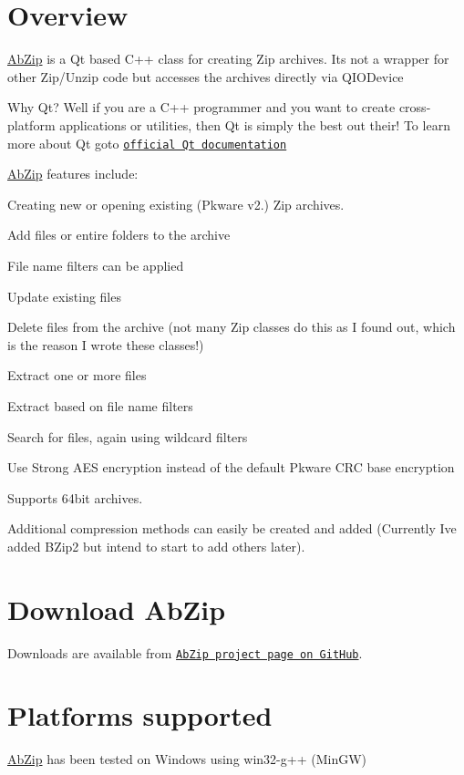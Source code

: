 \hypertarget{index_overview}{}\section{Overview}\label{index_overview}
\hyperlink{class_ab_zip}{Ab\+Zip} is a Qt based C++ class for creating Zip archives. It\textquotesingle{}s not a wrapper for other Zip/\+Unzip code but accesses the archives directly via Q\+I\+O\+Device

Why Qt? Well if you are a C++ programmer and you want to create cross-\/platform applications or utilities, then Qt is simply the best out their! To learn more about Qt goto \href{http://qt-project.org/doc/}{\tt official Qt documentation}

\hyperlink{class_ab_zip}{Ab\+Zip} features include\+:
\begin{DoxyItemize}
\item Creating new or opening existing (Pkware v2.) Zip archives.
\item Add files or entire folders to the archive
\item File name filters can be applied
\item Update existing files
\item Delete files from the archive (not many Zip classes do this as I found out, which is the reason I wrote these classes!)
\item Extract one or more files
\item Extract based on file name filters
\item Search for files, again using wildcard filters
\item Use Strong A\+ES encryption instead of the default Pkware C\+RC base encryption
\item Supports 64bit archives.
\item Additional compression methods can easily be created and added (Currently I\textquotesingle{}ve added B\+Zip2 but intend to start to add others later).
\end{DoxyItemize}\hypertarget{index_download}{}\section{Download Ab\+Zip}\label{index_download}
Downloads are available from \href{https://github.com/abelayer/AbZip}{\tt Ab\+Zip project page on Git\+Hub}.\hypertarget{index_platforms}{}\section{Platforms supported}\label{index_platforms}
\hyperlink{class_ab_zip}{Ab\+Zip} has been tested on Windows using win32-\/g++ (Min\+GW)

